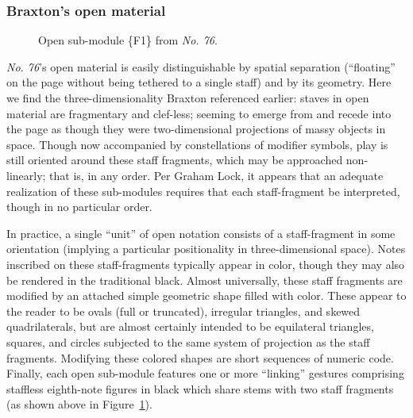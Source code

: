     \subsubsection{Braxton's open material}

            \begin{figure} 
                \centering
                \captionsetup{width=.55\textwidth}
                \caption[Open sub-module \{F1\} from \textit{No. 76}.]{Open sub-module \{F1\} from \textit{No. 76}.\footnotemark}
                \label{fig:openf1}
            \end{figure}
            
        \textit{No. 76}'s open material is easily distinguishable by spatial separation (``floating'' on the page without being tethered to a single staff) and by its geometry. Here we find the three-dimensionality Braxton referenced earlier: staves in open material are fragmentary and clef-less; seeming to emerge from and recede into the page as though they were two-dimensional projections of massy objects in space. Though now accompanied by constellations of modifier symbols, play is still oriented around these staff fragments, which may be approached non-linearly; that is, in any order. Per Graham Lock, it appears that an adequate realization of these sub-modules requires that each staff-fragment be interpreted, though in no particular order.\autocite[Postscript 3]{Lock_1989}
    
        In practice, a single ``unit'' of open notation consists of a staff-fragment in some orientation (implying a particular positionality in three-dimensional space). Notes inscribed on these staff-fragments typically appear in color, though they may also be rendered in the traditional black. Almost universally, these staff fragments are modified by an attached simple geometric shape filled with color. These appear to the reader to be ovals (full or truncated), irregular triangles, and skewed quadrilaterals, but are almost certainly intended to be equilateral triangles, squares, and circles subjected to the same system of projection as the staff fragments. Modifying these colored shapes are short sequences of numeric code. Finally, each open sub-module features one or more ``linking'' gestures comprising staffless eighth-note figures in black which share stems with two staff fragments (as shown above in Figure~\ref{fig:openf1}). 

